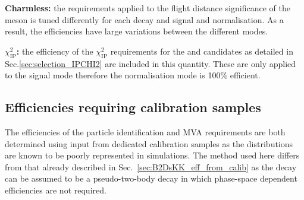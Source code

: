 \begin{description}
\item \textbf{Charmless:} the requirements applied to the flight distance significance of the \Dsp meson is tuned differently for each \Dsp decay and signal and normalisation. As a result, the efficiencies have large variations between the different modes.

\item \textbf{$\chi^{2}_{\text{IP}}$:} the efficiency of the $\chi^{2}_{\text{IP}}$ requirements for the \Bp and \Dsp candidates as detailed in Sec.\ref{sec:selection_IPCHI2} are included in this quantity. These are only applied to the signal mode therefore the normalisation mode is 100\% efficient.

\end{description}





\subsection{Efficiencies requiring calibration samples}

The efficiencies of the particle identification and MVA requirements are both determined using input from dedicated calibration samples as the distributions are known to be poorly represented in simulations. The method used here differs from that already described in Sec.~\ref{sec:B2DsKK_eff_from_calib} as the \decay{\Bp}{\Dsp\phiz} decay can be assumed to be a pseudo-two-body decay in which phase-space dependent efficiencies are not required. 

